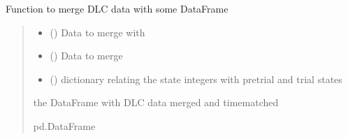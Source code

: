 \documentclass[letterpaper,10pt,english]{sphinxmanual}
\begin{document}
\begin{fulllineitems}
\begin{fulllineitems}
\label{\detokenize{BurrowFearConditioning:BurrowFearConditioning.DeepLabData.merge_dlc_data}}
\pysigstartsignatures
{}
\pysigstopsignatures
\sphinxAtStartPar
Function to merge DLC data with some DataFrame
\begin{quote}\begin{description}
\begin{itemize}
\item {} 
\sphinxAtStartPar
{} () \textendash{} Data to merge with

\item {} 
\sphinxAtStartPar
{} ({\hyperref[\detokenize{BurrowFearConditioning:BurrowFearConditioning.DeepLabData}]{}}) \textendash{} Data to merge

\item {} 
\sphinxAtStartPar
{} () \textendash{} dictionary relating the state integers with pre\sphinxhyphen{}trial and trial states

\end{itemize}

\sphinxAtStartPar
the DataFrame with DLC data merged and time\sphinxhyphen{}matched

\sphinxAtStartPar
pd.DataFrame

\end{description}\end{quote}

\end{fulllineitems}


\end{fulllineitems}

\end{document}
